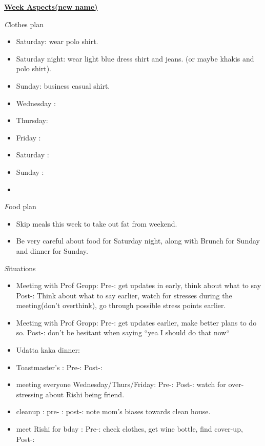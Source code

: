 \documentclass[serif,mathserif,final]{beamer}
\begin{document}
\begin{frame}{}
\begin{columns}[t]
\begin{column}{0.30\linewidth} {\textbf{\underline{Week Aspects(new name)}}}
  \begin{block}{\textit Clothes plan } 
    \begin{itemize} 
    \tiny \item \tiny Saturday: wear polo shirt. 
    \item \tiny Saturday night: wear light blue dress shirt and jeans. (or maybe khakis and polo shirt). 
    \item \tiny Sunday: business casual shirt. 
    \item \tiny Wednesday : 
    \item \tiny Thursday: 
    \item \tiny Friday : 
    \item \tiny Saturday : 
    \item \tiny Sunday : 
    \item \tiny   
    \end{itemize} 
  \end{block} 

  \begin{block}{\textit Food plan } 
    \begin{itemize} 
      \small \item \tiny Skip meals this week to take out fat from weekend. 
    \item \tiny Be very careful about food for Saturday night, along with Brunch for Sunday and dinner for Sunday. 
    \end{itemize} 
  \end{block} 

  \begin{block}{\textit Situations} 
    \begin{itemize} 
    \item \tiny Meeting with Prof Gropp: Pre-: get updates in early,
      think about what to say Post-:  Think about what to say earlier,
      watch for stresses during the meeting(don't overthink), go
      through possible stress points earlier.  
    \item \tiny Meeting with Prof Gropp: Pre-:  get updates earlier, make
      better plans to do so. Post-: don't be hesitant when saying ``yea I
      should do that now``
\item \tiny Udatta kaka dinner: 
\item \tiny Toastmaster's : Pre-:    Post-: 
\item \tiny meeting everyone Wednesday/Thurs/Friday: Pre-: Post-: watch for over-stressing about Rishi being friend. 
\item \tiny cleanup : pre- : post-:  note mom's biases towards clean house. 
\item \tiny meet Rishi for bday : Pre-: check clothes, get wine bottle, find cover-up,  Post-: 
  

\end{itemize}
\end{block}
\end{column}
\end{columns}
\end{frame}
\end{document}
